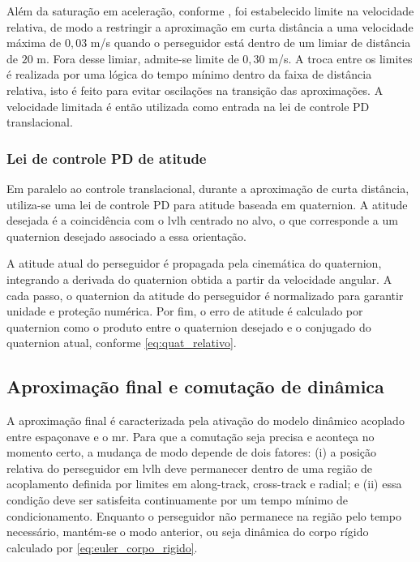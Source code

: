 Além da saturação em aceleração, conforme \cite{vedant2025longrange}, foi estabelecido limite na velocidade relativa, de modo a restringir a aproximação em curta distância a uma velocidade máxima de $0{,}03$ m/s quando o perseguidor está dentro de um limiar de distância de $20$ m. Fora desse limiar, admite-se limite de $0{,}30$ m/s.
A troca entre os limites é realizada por uma lógica do tempo mínimo dentro da faixa de distância relativa, isto é feito para evitar oscilações na transição das aproximações.
A velocidade limitada é então utilizada como entrada na lei de controle PD translacional.

\subsubsection{Lei de controle PD de atitude}
\label{subsubsec:lei_pd_atitude_quaternion}

Em paralelo ao controle translacional, durante a aproximação de curta distância, utiliza-se uma lei de controle PD para atitude baseada em quaternion.
A atitude desejada é a coincidência com o \gls{lvlh} centrado no alvo, o que corresponde a um quaternion desejado associado a essa orientação.

A atitude atual do perseguidor é propagada pela cinemática do quaternion, integrando a derivada do quaternion obtida a partir da velocidade angular.
A cada passo, o quaternion da atitude do perseguidor é normalizado para garantir unidade e proteção numérica.
Por fim, o erro de atitude é calculado por quaternion como o produto entre o quaternion desejado e o conjugado do quaternion atual, conforme \ref{eq:quat_relativo}.



\subsection{Aproximação final e comutação de dinâmica}
\label{subsec:aprox_final_comutacao_dinamica}

A aproximação final é caracterizada pela ativação do modelo dinâmico acoplado entre espaçonave e o \gls{mr}.
Para que a comutação seja precisa e aconteça no momento certo, a mudança de modo depende de dois fatores:
(i) a posição relativa do perseguidor em \gls{lvlh} deve permanecer dentro de uma região de acoplamento definida por limites em along-track, cross-track e radial; 
e (ii) essa condição deve ser satisfeita continuamente por um tempo mínimo de condicionamento.
Enquanto o perseguidor não permanece na região pelo tempo necessário, mantém-se o modo anterior, ou seja dinâmica do corpo rígido calculado por \ref{eq:euler_corpo_rigido}.

